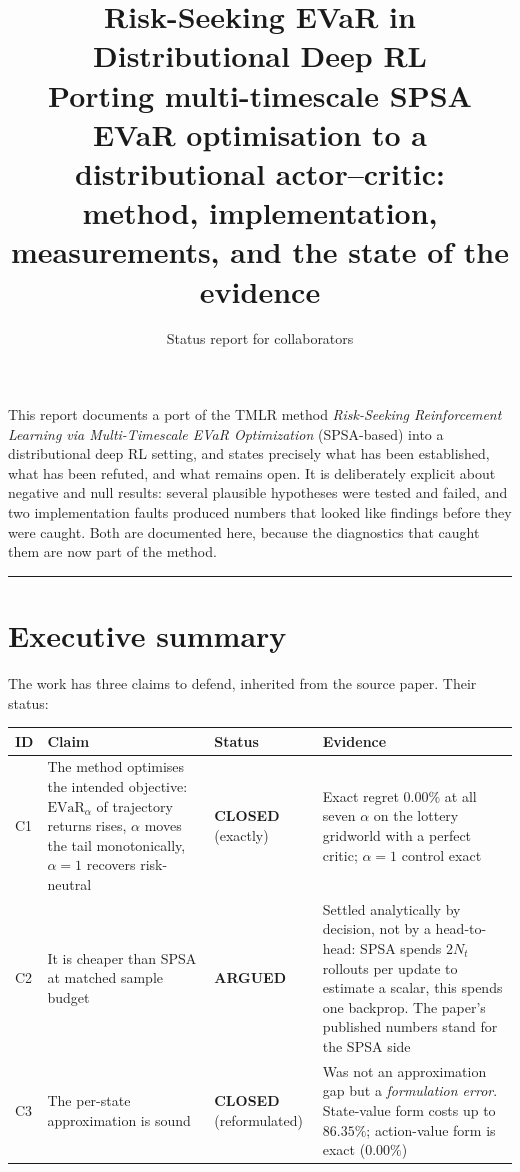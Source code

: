\documentclass[11pt,a4paper]{article}
\title{\vspace{-1.5cm}\textbf{Risk-Seeking EVaR in Distributional Deep RL}\\[0.3em]
\large Porting multi-timescale SPSA EVaR optimisation to a distributional
actor--critic:\\ method, implementation, measurements, and the state of the evidence}
\author{Status report for collaborators}
\date{}
\newcommand{\closed}{\textcolor{ok}{\textbf{CLOSED}}}
\newcommand{\evar}{\mathrm{EVaR}}
\begin{document}
\maketitle
\thispagestyle{fancy}
\vspace{-1.2cm}

\begin{center}
\begin{minipage}{0.93\textwidth}
\small\textcolor{soft}{
This report documents a port of the TMLR method \emph{Risk-Seeking Reinforcement
Learning via Multi-Timescale EVaR Optimization} (SPSA-based) into a distributional
deep RL setting, and states precisely what has been established, what has been
refuted, and what remains open. It is deliberately explicit about negative and
null results: several plausible hypotheses were tested and failed, and two
implementation faults produced numbers that looked like findings before they were
caught. Both are documented here, because the diagnostics that caught them are now
part of the method.}
\end{minipage}
\end{center}

\vspace{0.6em}
\hrule
\vspace{0.9em}

\section{Executive summary}

The work has three claims to defend, inherited from the source paper. Their status:

\begin{center}
\small
\begin{tabular}{@{}p{}p{}p{}p{}@{}}
\toprule
\textbf{ID} & \textbf{Claim} & \textbf{Status} & \textbf{Evidence} \\
\midrule
C1 & The method optimises the intended objective:
     $\evar_\alpha$ of trajectory returns rises, $\alpha$ moves the tail
     monotonically, $\alpha=1$ recovers risk-neutral
   & \closed{} \newline (exactly) &
     Exact regret $0.00\%$ at all seven $\alpha$ on the lottery gridworld with a
     perfect critic; $\alpha=1$ control exact \\[0.4em]
C2 & It is cheaper than SPSA at matched sample budget
   & \textcolor{soft}{\textbf{ARGUED}} &
     Settled analytically by decision, not by a head-to-head: SPSA spends $2N_t$
     rollouts per update to estimate a scalar, this spends one backprop. The
     paper's published numbers stand for the SPSA side \\[0.4em]
C3 & The per-state approximation is sound
   & \closed{} \newline (reformulated) &
     Was not an approximation gap but a \emph{formulation error}. State-value form
     costs up to $86.35\%$; action-value form is exact ($0.00\%$) \\
\bottomrule
\end{tabular}
\end{center}
\end{document}

